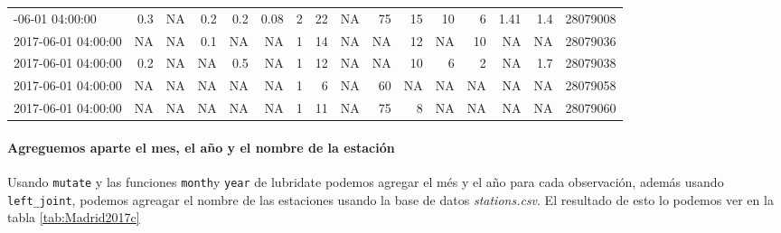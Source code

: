\documentclass[]{book}
\newenvironment{Shaded}{\begin{snugshade}}{\end{snugshade}}
\newcommand{\DataTypeTok}[1]{\textcolor[rgb]{0.13,0.29,0.53}{#1}}
\newcommand{\DecValTok}[1]{\textcolor[rgb]{0.00,0.00,0.81}{#1}}
\newcommand{\KeywordTok}[1]{\textcolor[rgb]{0.13,0.29,0.53}{\textbf{#1}}}
\newcommand{\NormalTok}[1]{#1}
\newcommand{\OperatorTok}[1]{\textcolor[rgb]{0.81,0.36,0.00}{\textbf{#1}}}
\newcommand{\StringTok}[1]{\textcolor[rgb]{0.31,0.60,0.02}{#1}}
\let\oldparagraph\paragraph
\renewcommand{\paragraph}[1]{\oldparagraph{#1}\mbox{}}
\begin{document}
\begin{table}
\begin{tabular}[t]{lrlrrrrrlrrrrrrr}
\addlinespace
2017-06-01 04:00:00 & 0.3 & NA & 0.2 & 0.2 & 0.08 & 2 & 22 & NA & 75 & 15 & 10 & 6 & 1.41 & 1.4 & 28079008\\
2017-06-01 04:00:00 & NA & NA & 0.1 & NA & NA & 1 & 14 & NA & NA & 12 & NA & 10 & NA & NA & 28079036\\
2017-06-01 04:00:00 & 0.2 & NA & NA & 0.5 & NA & 1 & 12 & NA & NA & 10 & 6 & 2 & NA & 1.7 & 28079038\\
2017-06-01 04:00:00 & NA & NA & NA & NA & NA & 1 & 6 & NA & 60 & NA & NA & NA & NA & NA & 28079058\\
2017-06-01 04:00:00 & NA & NA & NA & NA & NA & 1 & 11 & NA & 75 & 8 & NA & NA & NA & NA & 28079060\\
\bottomrule
\end{tabular}
\end{table}

\hypertarget{agreguemos-aparte-el-mes-el-ano-y-el-nombre-de-la-estacion}{%
\paragraph{Agreguemos aparte el mes, el año y el nombre de la
estación}\label{agreguemos-aparte-el-mes-el-ano-y-el-nombre-de-la-estacion}}

Usando \texttt{mutate} y las funciones \texttt{month}y \texttt{year} de
lubridate podemos agregar el més y el año para cada observación, además
usando \texttt{left\_joint}, podemos agreagar el nombre de las
estaciones usando la base de datos \emph{stations.csv}. El resultado de
esto lo podemos ver en la tabla \ref{tab:Madrid2017c}

\begin{Shaded}
\end{Shaded}
\end{document}
